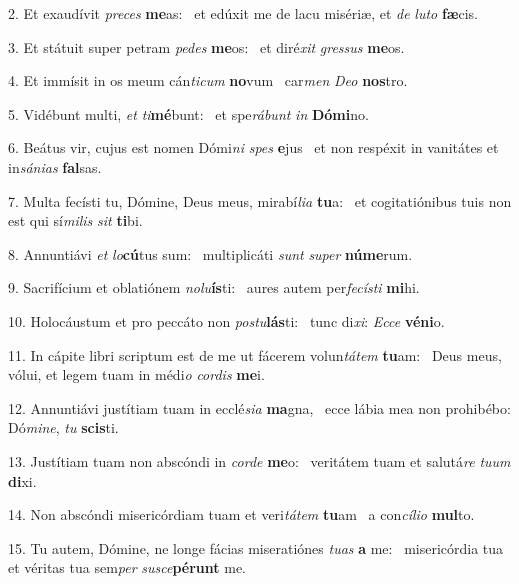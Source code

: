 2. Et exaudívit \textit{pre}\textit{ces} \textbf{me}as: \ast\  et edúxit me de lacu misériæ, et \textit{de} \textit{lu}\textit{to} \textbf{fæ}cis.\

3. Et státuit super petram \textit{pe}\textit{des} \textbf{me}os: \ast\  et diré\textit{xit} \textit{gres}\textit{sus} \textbf{me}os.\

4. Et immísit in os meum cán\textit{ti}\textit{cum} \textbf{no}vum \ast\  car\textit{men} \textit{De}\textit{o} \textbf{nos}tro.\

5. Vidébunt multi, \textit{et} \textit{ti}\textbf{mé}bunt: \ast\  et spe\textit{rá}\textit{bunt} \textit{in} \textbf{Dó}\textbf{mi}no.\

6. Beátus vir, cujus est nomen Dómi\textit{ni} \textit{spes} \textbf{e}jus \ast\  et non respéxit in vanitátes et in\textit{sá}\textit{ni}\textit{as} \textbf{fal}sas.\

7. Multa fecísti tu, Dómine, Deus meus, mirabí\textit{li}\textit{a} \textbf{tu}a: \ast\  et cogitatiónibus tuis non est qui sí\textit{mi}\textit{lis} \textit{sit} \textbf{ti}bi.\

8. Annuntiávi \textit{et} \textit{lo}\textbf{cú}tus sum: \ast\  multiplicáti \textit{sunt} \textit{su}\textit{per} \textbf{nú}\textbf{me}rum.\

9. Sacrifícium et oblatiónem \textit{no}\textit{lu}\textbf{ís}ti: \ast\  aures autem per\textit{fe}\textit{cís}\textit{ti} \textbf{mi}hi.\

10. Holocáustum et pro peccáto non \textit{pos}\textit{tu}\textbf{lás}ti: \ast\  tunc di\textit{xi}: \textit{Ec}\textit{ce} \textbf{vé}\textbf{ni}o.\

11. In cápite libri scriptum est de me ut fácerem volun\textit{tá}\textit{tem} \textbf{tu}am: \ast\  Deus meus, vólui, et legem tuam in médi\textit{o} \textit{cor}\textit{dis} \textbf{me}i.\

12. Annuntiávi justítiam tuam in ecclé\textit{si}\textit{a} \textbf{ma}gna, \ast\  ecce lábia mea non prohibébo: Dó\textit{mi}\textit{ne}, \textit{tu} \textbf{scis}ti.\

13. Justítiam tuam non abscóndi in \textit{cor}\textit{de} \textbf{me}o: \ast\  veritátem tuam et salutá\textit{re} \textit{tu}\textit{um} \textbf{di}xi.\

14. Non abscóndi misericórdiam tuam et veri\textit{tá}\textit{tem} \textbf{tu}am \ast\  a con\textit{cí}\textit{li}\textit{o} \textbf{mul}to.\

15. Tu autem, Dómine, ne longe fácias miseratiónes \textit{tu}\textit{as} \textbf{a} me: \ast\  misericórdia tua et véritas tua sem\textit{per} \textit{su}\textit{sce}\textbf{pé}\textbf{runt} me.\

